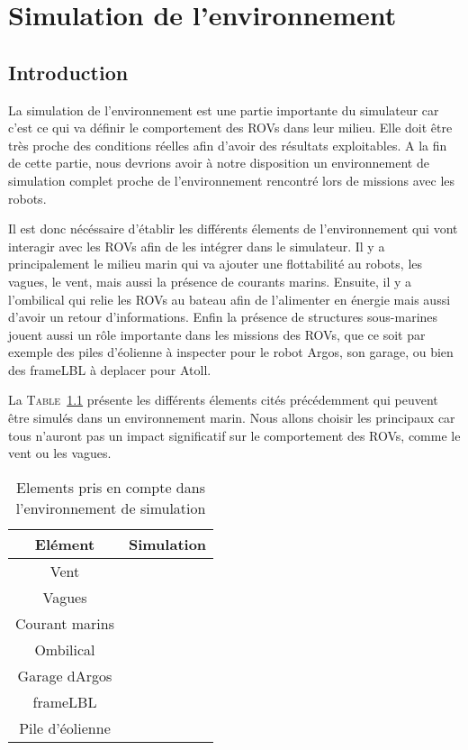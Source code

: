 \chapter{Simulation de l'environnement}
\label{chapitre:environnement}
	
	\section{Introduction}

		La simulation de l'environnement est une partie importante du simulateur car c'est ce qui va définir le comportement des \gls{ROV}s dans leur milieu. Elle doit être très proche des conditions réelles afin d'avoir des résultats exploitables. A la fin de cette partie, nous devrions avoir à notre disposition un environnement de simulation complet proche de l'environnement rencontré lors de missions avec les robots.

		Il est donc nécéssaire d'établir les différents élements de l'environnement qui vont interagir avec les \gls{ROV}s afin de les intégrer dans le simulateur. Il y a principalement le milieu marin qui va ajouter une flottabilité au robots, les vagues, le vent, mais aussi la présence de courants marins. Ensuite, il y a l'ombilical qui relie les \gls{ROV}s au bateau afin de l'alimenter en énergie mais aussi d'avoir un retour d'informations. Enfin la présence de structures sous-marines jouent aussi un rôle importante dans les missions des \gls{ROV}s, que ce soit par exemple des piles d'éolienne à inspecter pour le robot \gls{Argos}, son garage, ou bien des \gls{frameLBL} à deplacer pour \gls{Atoll}.

		La \textsc{Table}~\ref{table:elements} présente les différents élements cités précédemment qui peuvent être simulés dans un environnement marin. Nous allons choisir les principaux car tous n'auront pas un impact significatif sur le comportement des \gls{ROV}s, comme le vent ou les vagues. 

		\begin{table}[ht]
			\centering
			\begin{tabular}{|c|c|}
				\hline
				\textbf{Elément} & \textbf{Simulation} \\
				\hline
				Vent & \xmark\\
				\hline
				Vagues & \xmark\\
				\hline
				Courant marins & \cmark \\
				\hline
				Ombilical & \cmark \\
				\hline
				Garage d\gls{Argos} & \cmark \\
				\hline
				\gls{frameLBL} & \cmark \\
				\hline
				Pile d'éolienne & \cmark \\
				\hline
			\end{tabular}
			\caption{Elements pris en compte dans l'environnement de simulation}
			\label{table:elements}
		\end{table}

